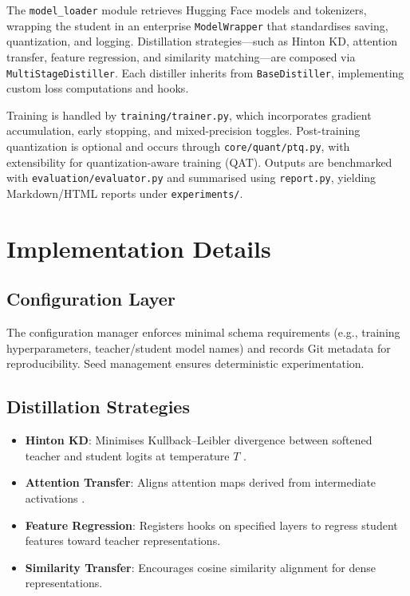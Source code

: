 \documentclass[conference]{IEEEtran}
\begin{document}
The \texttt{model\_loader} module retrieves Hugging Face models and tokenizers, wrapping the student in an enterprise \texttt{ModelWrapper} that standardises saving, quantization, and logging. Distillation strategies---such as Hinton KD, attention transfer, feature regression, and similarity matching---are composed via \texttt{MultiStageDistiller}. Each distiller inherits from \texttt{BaseDistiller}, implementing custom loss computations and hooks.

Training is handled by \texttt{training/trainer.py}, which incorporates gradient accumulation, early stopping, and mixed-precision toggles. Post-training quantization is optional and occurs through \texttt{core/quant/ptq.py}, with extensibility for quantization-aware training (QAT). Outputs are benchmarked with \texttt{evaluation/evaluator.py} and summarised using \texttt{report.py}, yielding Markdown/HTML reports under \texttt{experiments/}.

\section{Implementation Details}
\subsection{Configuration Layer}
The configuration manager enforces minimal schema requirements (e.g., training hyperparameters, teacher/student model names) and records Git metadata for reproducibility. Seed management ensures deterministic experimentation.

\subsection{Distillation Strategies}
\begin{itemize}[leftmargin=*, noitemsep]
    \item \textbf{Hinton KD}: Minimises Kullback--Leibler divergence between softened teacher and student logits at temperature $T$ \cite{hinton2015distilling}.
    \item \textbf{Attention Transfer}: Aligns attention maps derived from intermediate activations \cite{zagoruyko2017paying}.
    \item \textbf{Feature Regression}: Registers hooks on specified layers to regress student features toward teacher representations.
    \item \textbf{Similarity Transfer}: Encourages cosine similarity alignment for dense representations.
\end{itemize}
\end{document}
